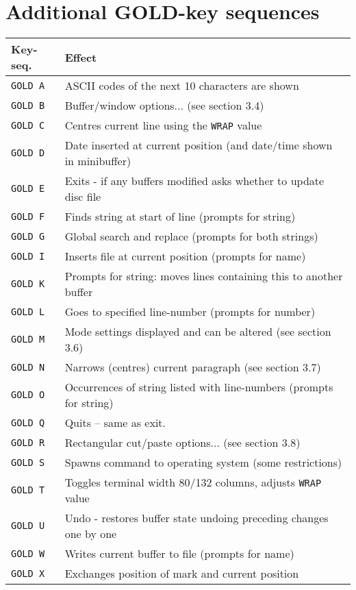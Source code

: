 \section{Additional GOLD-key sequences}

\begin{center}
\begin{tabular}{|ll|}
\hline
Key-seq. & Effect \\
\hline
{\tt GOLD A} & ASCII codes of the next 10 characters are shown\\
{\tt GOLD B} & Buffer/window options... (see section 3.4) \\
{\tt GOLD C} & Centres current line using the {\tt WRAP} value \\
{\tt GOLD D} & Date inserted at current position (and date/time shown in minibuffer)\\
{\tt GOLD E} & Exits - if any buffers modified asks whether to update disc file \\
{\tt GOLD F} & Finds string at start of line (prompts for string) \\
{\tt GOLD G} & Global search and replace (prompts for both strings) \\
{\tt GOLD I} & Inserts file at current position (prompts for name) \\
{\tt GOLD K} & Prompts for string: moves lines containing this to another
buffer \\
{\tt GOLD L} & Goes to specified line-number (prompts for number) \\
{\tt GOLD M} & Mode settings displayed and can be altered (see section 3.6) \\
{\tt GOLD N} & Narrows (centres) current paragraph (see section 3.7) \\
{\tt GOLD O} & Occurrences of string listed with line-numbers (prompts for string)\\
{\tt GOLD Q} & Quits -- same as exit. \\
{\tt GOLD R} & Rectangular cut/paste options... (see section 3.8) \\
{\tt GOLD S} & Spawns command to operating system (some restrictions) \\ 
{\tt GOLD T} & Toggles terminal width 80/132 columns, adjusts {\tt WRAP} value\\
{\tt GOLD U} & Undo - restores buffer state undoing preceding changes one by one\\
{\tt GOLD W} & Writes current buffer to file (prompts for name) \\
{\tt GOLD X} & Exchanges position of mark and current position \\

\end{tabular}
\end{center}
